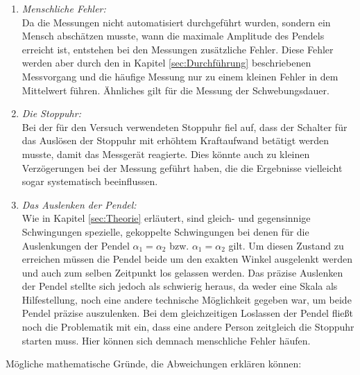 \begin{enumerate}
    \item \textit{Menschliche Fehler:}\\
        Da die Messungen nicht automatisiert durchgeführt wurden, sondern ein Mensch abschätzen musste, wann die maximale
        Amplitude des Pendels erreicht ist, entstehen bei den Messungen zusätzliche Fehler. Diese Fehler werden aber durch den in Kapitel
        \ref{sec:Durchführung} beschriebenen Messvorgang und die häufige Messung nur zu einem kleinen Fehler in dem Mittelwert
        führen. Ähnliches gilt für die Messung der Schwebungsdauer.
    \item \textit{Die Stoppuhr:}\\
        Bei der für den Versuch verwendeten Stoppuhr fiel auf, dass der Schalter für das Auslösen der Stoppuhr mit erhöhtem
        Kraftaufwand betätigt werden musste, damit das Messgerät reagierte. Dies könnte auch zu kleinen Verzögerungen bei der
        Messung geführt haben, die die Ergebnisse vielleicht sogar systematisch beeinflussen.
    \item \textit{Das Auslenken der Pendel:}\\
        Wie in Kapitel \ref{sec:Theorie} erläutert, sind gleich- und gegensinnige Schwingungen spezielle, gekoppelte Schwingungen bei
        denen für die Auslenkungen der Pendel $\alpha_1=\alpha_2$ bzw. $\alpha_1=\alpha_2$ gilt. Um diesen Zustand zu erreichen
        müssen die Pendel beide um den exakten Winkel ausgelenkt werden und auch zum selben Zeitpunkt los gelassen werden. Das
        präzise Auslenken der Pendel stellte sich jedoch als schwierig heraus, da weder eine Skala als Hilfestellung, noch
        eine andere technische Möglichkeit gegeben war, um beide Pendel präzise auszulenken. Bei dem gleichzeitigen Loslassen
        der Pendel fließt noch die Problematik mit ein, dass eine andere Person zeitgleich die Stoppuhr starten muss. Hier
        können sich demnach menschliche Fehler häufen.
\end{enumerate}
Mögliche mathematische Gründe, die Abweichungen erklären können:
